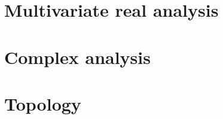 \documentclass[oneside]{book}
\begin{document}
\part{Multivariate real analysis}










\part{Complex analysis}



\part{Topology}










\end{document}
